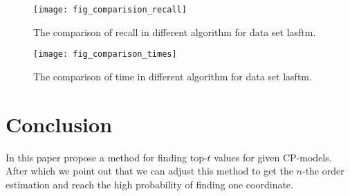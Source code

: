 \documentclass[letterpaper]{article}
\begin{document}
\begin{figure}[H]
  \centering
  \texttt{[image: fig\_comparision\_recall]}\\
  \caption{The comparison of recall in different algorithm for data set lasftm.}
  \label{fig:Comparison_recall}
\end{figure}

\begin{figure}[H]
    \centering
    \texttt{[image: fig\_comparison\_times]}\\
    \caption{The comparison of time in different algorithm for data set lasftm.}
\label{fig:Comparison_time}
\end{figure}

\section{Conclusion}
In this paper propose a method for finding top-$t$ values for given CP-models.
After which we point out that we can adjust this method to get the $n$-the order estimation
and reach the high probability of finding one coordinate.


\end{document}
